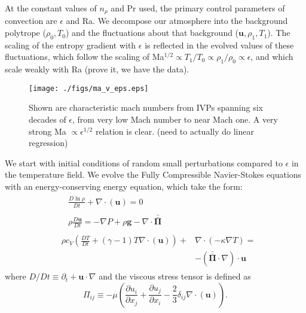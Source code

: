 \documentclass[aps, prl, twocolumn, groupedaddress]{revtex4-1}
\newcommand{\Div}[1]{\ensuremath{\nabla\cdot\left( #1\right)}}
\newcommand{\grad}{\ensuremath{\nabla}}
\newcommand{\stressT}{\ensuremath{\bm{\bar{\bar{\Pi}}}}}
\begin{document}
At the constant values of $n_\rho$ and Pr used, the primary control parameters of convection are $\epsilon$
and Ra.  We decompose our atmosphere into the background polytrope ($\rho_{0}, T_{0}$) and the fluctuations
about that background ($\bm{u}, \rho_{1}, T_{1}$).  The scaling of the entropy gradient with $\epsilon$
is reflected in the evolved values of these fluctuations, which follow the scaling of
Ma$^{1/2} \propto T_1/T_0 \propto \rho_{1}/\rho_{0} \propto \epsilon$, and which scale weakly with Ra (prove it,
we have the data). 

\begin{figure}[t]
\texttt{[image: ./figs/ma\_v\_eps.eps]}
\caption{Shown are characteristic mach numbers from IVPs spanning six decades of $\epsilon$, from
very low Mach number to near Mach one.  A very strong Ma $\propto \epsilon^{1/2}$ relation is clear. 
(need to actually do linear regression)
\label{fig:ma_v_eps} }
\end{figure}



We start with initial conditions of random small perturbations compared to $\epsilon$ in the temperature
field.  We evolve the Fully Compressible Navier-Stokes equations with an energy-conserving energy equation,
which take the form:
\begin{align}
&\begin{aligned}
&\frac{D \ln\rho}{D t} + \Div{\bm{u}} = 0
	\label{eqn:continuity_eqn}
\end{aligned}\\
&\begin{aligned}
&\rho\frac{D\bm{u}}{D t}=
-\grad P + \rho\bm{g} - \nabla\cdot\stressT
	\label{eqn:momentum_eqn}
\end{aligned}\\
&\begin{aligned}
\rho c_V\left(\frac{D T}{D t} + (\gamma-1)T\Div{\bm{u}}\right) + &\Div{-\kappa\grad T} = \\
&-\left(\stressT\cdot\nabla\right)\cdot\bm{u} 
	\label{eqn:energy_eqn}
\end{aligned}
\end{align}
where $D/Dt \equiv \partial_t + \bm{u}\cdot\grad$ and the viscous stress tensor is defined as
\begin{equation}
\Pi_{ij} \equiv -\mu\left(\frac{\partial u_i}{\partial x_j} + \frac{\partial u_j}{\partial x_i} - \frac{2}{3}\delta_{ij}\Div{\bm{u}}\right).
	\label{eqn:stress_tensor}
\end{equation}
\end{document}
